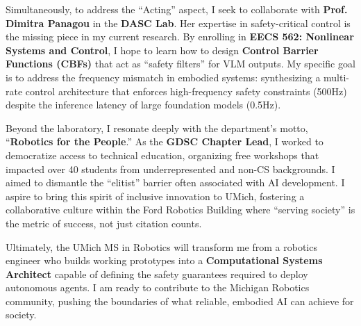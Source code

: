 \documentclass[11pt]{article}
\begin{document}
Simultaneously, to address the ``Acting'' aspect, I seek to collaborate with \textbf{Prof. Dimitra Panagou} in the \textbf{DASC Lab}. Her expertise in safety-critical control is the missing piece in my current research. By enrolling in \textbf{EECS 562: Nonlinear Systems and Control}, I hope to learn how to design \textbf{Control Barrier Functions (CBFs)} that act as ``safety filters'' for VLM outputs. My specific goal is to address the frequency mismatch in embodied systems: synthesizing a multi-rate control architecture that enforces high-frequency safety constraints (500Hz) despite the inference latency of large foundation models (0.5Hz).

Beyond the laboratory, I resonate deeply with the department’s motto, ``\textbf{Robotics for the People}.'' As the \textbf{GDSC Chapter Lead}, I worked to democratize access to technical education, organizing free workshops that impacted over 40 students from underrepresented and non-CS backgrounds. I aimed to dismantle the ``elitist'' barrier often associated with AI development. I aspire to bring this spirit of inclusive innovation to UMich, fostering a collaborative culture within the Ford Robotics Building where ``serving society'' is the metric of success, not just citation counts.

Ultimately, the UMich MS in Robotics will transform me from a robotics engineer who builds working prototypes into a \textbf{Computational Systems Architect} capable of defining the safety guarantees required to deploy autonomous agents. I am ready to contribute to the Michigan Robotics community, pushing the boundaries of what reliable, embodied AI can achieve for society.
\end{document}
